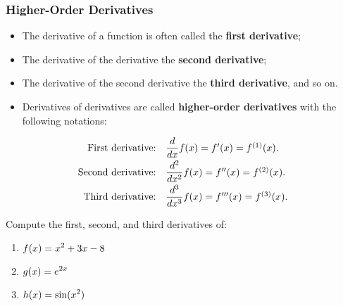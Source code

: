 \documentclass[10pt,t,presentation,ignorenonframetext,aspectratio=169]{beamer}
\title[\course]{\lecTitle}
\institute[Ohio State]
{
  \medskip
}
\date[\week]{\semester}
\author{Tae Eun Kim, Ph.D.}
\begin{document}
\begin{frame}
  \titlepage
\end{frame}

\begin{frame}
  \frametitle{Higher-Order Derivatives}

  \begin{itemize}
  \item The derivative of a function is often called the \textbf{first derivative};
  \item The derivative of the derivative the \textbf{second derivative};
  \item The derivative of the second derivative the \textbf{third derivative}, and
    so on.
  \item Derivatives of derivatives are called \textbf{higher-order derivatives} with the following notations:
  \end{itemize}

  \[
    \begin{array}{rl}
      \text{First derivative:} & \dfrac{d}{dx} f(x) = f'(x) = f^{(1)}(x). \vspace{0.3em} \\
      \text{Second derivative:} & \dfrac{d^2}{dx^2} f(x) = f''(x) = f^{(2)}(x).\vspace{0.3em}  \\
      \text{Third derivative:} & \dfrac{d^3}{dx^3} f(x) = f'''(x) = f^{(3)}(x).
    \end{array}
  \]
\end{frame}

\begin{frame}
  \vs{}
  \question{} Compute the first, second, and third derivatives of:
  \begin{enumerate}
  \item $\displaystyle f(x) = x^2 + 3x - 8$ \vfill
  \item $\displaystyle g(x) = e^{2x}$ \vfill
  \item $\displaystyle h(x) = \sin(x^2)$ \vfill
  \end{enumerate}
\end{frame}
\end{document}
